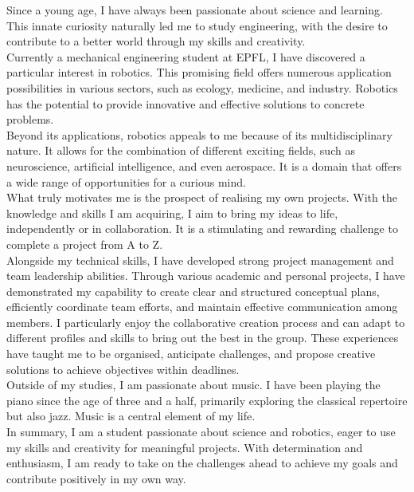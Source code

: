 \documentclass[letterpaper,11pt]{article}
\begin{document}
  \begin{center}
  \parbox{6.762in}{
Since a young age, I have always been passionate about science and learning. This innate curiosity naturally led me to study engineering, with the desire to contribute to a better world through my skills and creativity.\\
Currently a mechanical engineering student at EPFL, I have discovered a particular interest in robotics. This promising field offers numerous application possibilities in various sectors, such as ecology, medicine, and industry. Robotics has the potential to provide innovative and effective solutions to concrete problems.\\
Beyond its applications, robotics appeals to me because of its multidisciplinary nature. It allows for the combination of different exciting fields, such as neuroscience, artificial intelligence, and even aerospace. It is a domain that offers a wide range of opportunities for a curious mind.\\
What truly motivates me is the prospect of realising my own projects. With the knowledge and skills I am acquiring, I aim to bring my ideas to life, independently or in collaboration. It is a stimulating and rewarding challenge to complete a project from A to Z.\\
Alongside my technical skills, I have developed strong project management and team leadership abilities. Through various academic and personal projects, I have demonstrated my capability to create clear and structured conceptual plans, efficiently coordinate team efforts, and maintain effective communication among members. I particularly enjoy the collaborative creation process and can adapt to different profiles and skills to bring out the best in the group. These experiences have taught me to be organised, anticipate challenges, and propose creative solutions to achieve objectives within deadlines.\\
Outside of my studies, I am passionate about music. I have been playing the piano since the age of three and a half, primarily exploring the classical repertoire but also jazz. Music is a central element of my life.\\
In summary, I am a student passionate about science and robotics, eager to use my skills and creativity for meaningful projects. With determination and enthusiasm, I am ready to take on the challenges ahead to achieve my goals and contribute positively in my own way.
  }
  \end{center}
\end{document}
